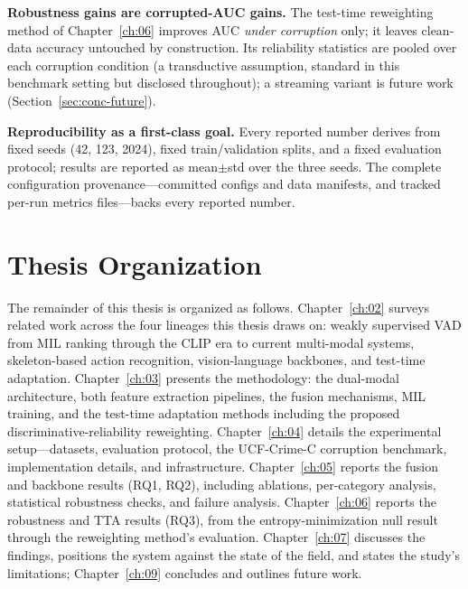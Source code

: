 \textbf{Robustness gains are corrupted-AUC gains.} The test-time reweighting method of
Chapter~\ref{ch:06} improves AUC \emph{under corruption} only; it leaves clean-data accuracy
untouched by construction. Its reliability statistics are pooled over each corruption condition (a
transductive assumption, standard in this benchmark setting but disclosed throughout); a streaming
variant is future work (Section~\ref{sec:conc-future}).

\textbf{Reproducibility as a first-class goal.} Every reported number derives from fixed seeds (42,
123, 2024), fixed train/validation splits, and a fixed evaluation protocol; results are reported as
mean$\pm$std over the three seeds. The complete configuration provenance---committed configs and
data manifests, and tracked per-run metrics files---backs every reported number.

\section{Thesis Organization}
\label{sec:intro-roadmap}

The remainder of this thesis is organized as follows. Chapter~\ref{ch:02} surveys related work
across the four lineages this thesis draws on: weakly supervised VAD from MIL ranking through the
CLIP era to current multi-modal systems, skeleton-based action recognition, vision-language
backbones, and test-time adaptation. Chapter~\ref{ch:03} presents the methodology: the dual-modal
architecture, both feature extraction pipelines, the fusion mechanisms, MIL training, and the
test-time adaptation methods including the proposed discriminative-reliability reweighting.
Chapter~\ref{ch:04} details the experimental setup---datasets, evaluation protocol, the UCF-Crime-C
corruption benchmark, implementation details, and infrastructure. Chapter~\ref{ch:05} reports the
fusion and backbone results (RQ1, RQ2), including ablations, per-category analysis, statistical
robustness checks, and failure analysis. Chapter~\ref{ch:06} reports the robustness and TTA results
(RQ3), from the entropy-minimization null result through the reweighting method's evaluation.
Chapter~\ref{ch:07} discusses the findings, positions the system against the state of the field,
and states the study's limitations; Chapter~\ref{ch:09} concludes and outlines future work.
